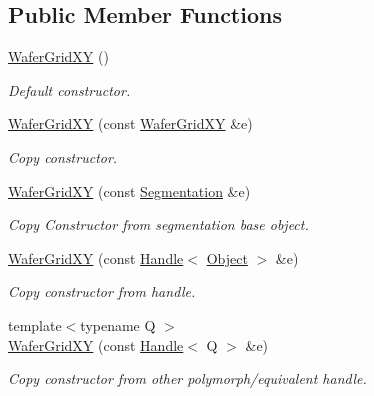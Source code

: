 \subsection*{Public Member Functions}
\begin{DoxyCompactItemize}
\item 
\hyperlink{class_d_d4hep_1_1_geometry_1_1_wafer_grid_x_y_a01215216f63ad87ba40a86e5c4320896}{WaferGridXY} ()
\begin{DoxyCompactList}\small\item\em Default constructor. \item\end{DoxyCompactList}\item 
\hyperlink{class_d_d4hep_1_1_geometry_1_1_wafer_grid_x_y_a7f66d48035db3df949399962957ed7f3}{WaferGridXY} (const \hyperlink{class_d_d4hep_1_1_geometry_1_1_wafer_grid_x_y}{WaferGridXY} \&e)
\begin{DoxyCompactList}\small\item\em Copy constructor. \item\end{DoxyCompactList}\item 
\hyperlink{class_d_d4hep_1_1_geometry_1_1_wafer_grid_x_y_aa6d983e937d1912b96e3a2f120458afa}{WaferGridXY} (const \hyperlink{class_d_d4hep_1_1_geometry_1_1_segmentation}{Segmentation} \&e)
\begin{DoxyCompactList}\small\item\em Copy Constructor from segmentation base object. \item\end{DoxyCompactList}\item 
\hyperlink{class_d_d4hep_1_1_geometry_1_1_wafer_grid_x_y_a40cd601f880f3a345e62dd233d4f8345}{WaferGridXY} (const \hyperlink{class_d_d4hep_1_1_handle}{Handle}$<$ \hyperlink{class_t}{Object} $>$ \&e)
\begin{DoxyCompactList}\small\item\em Copy constructor from handle. \item\end{DoxyCompactList}\item 
{\footnotesize template$<$typename Q $>$ }\\\hyperlink{class_d_d4hep_1_1_geometry_1_1_wafer_grid_x_y_aa2baf7a79ef17ba46038d243c700a588}{WaferGridXY} (const \hyperlink{class_d_d4hep_1_1_handle}{Handle}$<$ Q $>$ \&e)
\begin{DoxyCompactList}\small\item\em Copy constructor from other polymorph/equivalent handle. \item\end{DoxyCompactList}\item 

\end{DoxyCompactItemize}
